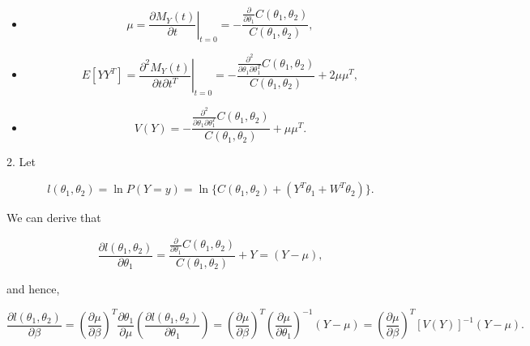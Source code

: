 \documentclass[UTF8,a4paper,10pt]{article}
\begin{document}
\begin{Problem}[]{}
\begin{itemize}
  \item \[\mu=\left.\frac{\partial M_Y(t)}{\partial t}\right|_{t=0}=-\dfrac{\frac{\partial}{\partial \theta_1} C\left(\theta_1, \theta_2\right)}{C\left(\theta_1, \theta_2\right)},\]
  \item \[E\left[Y Y^T\right]=\left.\dfrac{\partial^2 M_Y(t)}{\partial t \partial t^T}\right|_{t=0}=-\frac{\frac{\partial^2}{\partial \theta_1 \partial \theta_1^T} C\left(\theta_1, \theta_2\right)}{C\left(\theta_1, \theta_2\right)}+2 \mu \mu^T,\]
  \item \[V(Y)=-\dfrac{\frac{\partial^2}{\partial \theta_1 \partial \theta_1^T} C\left(\theta_1, \theta_2\right)}{C\left(\theta_1, \theta_2\right)}+\mu \mu^T.\]
\end{itemize}

2. Let 

\[l(\theta_1,\theta_2) = \ln P(Y=y) = \ln \{C(\theta_1,\theta_2)+(Y^T\theta_1 +W^T \theta_2)\}.\]

We can derive that

\[\dfrac{\partial l\left(\theta_1, \theta_2\right)}{\partial \theta_1}=\dfrac{\frac{\partial}{\partial \theta_1} C\left(\theta_1, \theta_2\right)}{C\left(\theta_1, \theta_2\right)}+Y=(Y-\mu),\]

 and hence,
 
$$
\frac{\partial l\left(\theta_1, \theta_2\right)}{\partial \beta}=\left(\frac{\partial \mu}{\partial \beta}\right)^T \frac{\partial \theta_1}{\partial \mu}\left(\frac{\partial l\left(\theta_1, \theta_2\right)}{\partial \theta_1}\right)=\left(\frac{\partial \mu}{\partial \beta}\right)^T\left(\frac{\partial \mu}{\partial \theta_1}\right)^{-1}(Y-\mu)=\left(\frac{\partial \mu}{\partial \beta}\right)^T[V(Y)]^{-1}(Y-\mu) .
$$
\end{Problem}
\end{document}
